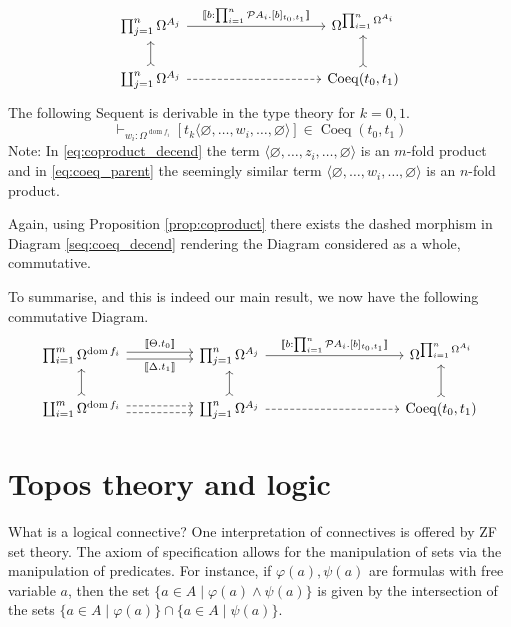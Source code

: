 \documentclass{birkjour}
\theoremstyle{plain}
\theoremstyle{definition}
\newcommand{\call}[1]{\mathcal{#1}}
\begin{document}
	\begin{equation}\label{eq:coeq_parent}
		\begin{tikzcd}[column sep = huge]
			\prod_{j = 1}^n\Omega^{A_j} \arrow[rr,"{\llbracket b:\prod_{i = 1}^n \call{P}A_i. [b]_{t_0,t_1} \rrbracket}"] && \Omega^{\prod_{i = 1}^n \Omega^{A_i}}\\
			\coprod_{j = 1}^n \Omega^{A_j}\arrow[u,rightarrowtail]\arrow[rr,dashed] && \operatorname{Coeq}(t_0,t_1)\arrow[u,rightarrowtail]
		\end{tikzcd}
	\end{equation}
	The following Sequent is derivable in the type theory for $k=0,1$.
	\begin{equation}\label{seq:coeq_decend}
		\vdash_{w_i:\Omega^{\operatorname{dom}f_i}}[t_k\langle \varnothing, \hdots, w_i, \hdots, \varnothing \rangle] \in \operatorname{Coeq}(t_0,t_1)
	\end{equation}
	Note: In \eqref{eq:coproduct_decend} the term $\langle \varnothing, \hdots, z_i, \hdots, \varnothing \rangle$ is an $m$-fold product and in \eqref{eq:coeq_parent} the seemingly similar term $\langle \varnothing, \hdots, w_i, \hdots, \varnothing \rangle$ is an $n$-fold product.
	
	Again, using Proposition \ref{prop:coproduct} there exists the dashed morphism in Diagram \eqref{seq:coeq_decend} rendering the Diagram considered as a whole, commutative.
	
	To summarise, and this is indeed our main result, we now have the following commutative Diagram.
	\begin{equation}\label{eq:colimit_complete}
		\begin{tikzcd}[column sep = huge]
			\prod_{i = 1}^m \Omega^{\operatorname{dom}f_i}\arrow[r,shift left, "{\llbracket\Theta.  t_0 \rrbracket}"]\arrow[r,swap,shift right,"{\llbracket \Delta. t_1\rrbracket}"] & \prod_{j = 1}^n\Omega^{A_j} \arrow[rr,"{\llbracket b:\prod_{i = 1}^n \call{P}A_i. [b]_{t_0,t_1} \rrbracket}"] & & \Omega^{\prod_{i = 1}^n \Omega^{A_i}}\\
			\coprod_{i = 1}^m \Omega^{\operatorname{dom}f_i}\arrow[u,rightarrowtail]\arrow[r,shift left, dashed]\arrow[r,dashed, shift right] & \coprod_{j = 1}^n \Omega^{A_j}\arrow[u,rightarrowtail]\arrow[rr,dashed] & & \operatorname{Coeq}(t_0,t_1)\arrow[u,rightarrowtail]
		\end{tikzcd}
	\end{equation}
	
	
	\appendix
	\section{Topos theory and logic}\label{sec:topos_struc}
	What is a logical connective? One interpretation of connectives is offered by ZF set theory. The axiom of specification allows for the manipulation of sets via the manipulation of predicates. For instance, if $\varphi(a),\psi(a)$ are formulas with free variable $a$, then the set $\lbrace a\in A \mid \varphi(a) \wedge \psi(a)\rbrace$ is given by the intersection of the sets $\lbrace a \in A \mid \varphi(a)\rbrace \cap \lbrace a \in A \mid \psi(a)\rbrace$.
	
\end{document}
